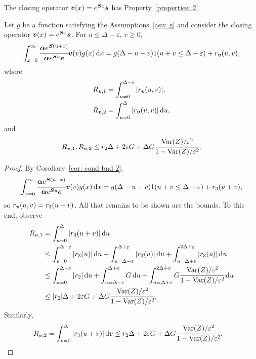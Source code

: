 \begin{cor}\label{cor: cond bnd 2 V}
	The closing operator \(\boldsymbol v(x)=e^{\boldsymbol S x}\boldsymbol s\) has Property~\ref{properties: 2}.

	Let \(g\) be a function satisfying the Assumptions~\ref{asu: g} and consider the closing operator \({\boldsymbol v}(x)=e^{\boldsymbol Sx}\boldsymbol s\). For \(u\leq \Delta-\varepsilon \), \(v\geq 0\), 
	\[\int_{x=0}^\infty \cfrac{\boldsymbol \alpha  e^{\boldsymbol{S} (u+x)} }{\boldsymbol \alpha  e^{\boldsymbol{S} u} \boldsymbol e} {\boldsymbol v}(v)g(x)\, \mathrm{d} x = g(\Delta-u-v) 1(u+v\leq\Delta-\varepsilon) + r_{\boldsymbol v} (u,v),\]
	where 
	\begin{align*}
		\displaystyle R_{\boldsymbol v,1} &= \int_{u=0}^{\Delta-\varepsilon}|r_{\boldsymbol v}(u,v)|,
		\\R_{\boldsymbol v,2} &= \int_{u=0}^\Delta |r_{\boldsymbol v}(u,v)| \, \mathrm{d} u,
	\end{align*}
	and 
	\[R_{\boldsymbol v,1},R_{\boldsymbol v,2}\leq r_2\Delta + 2\varepsilon G + \Delta G \cfrac{\mathrm{Var}(Z)/\varepsilon^2}{1-\mathrm{Var}(Z)/\varepsilon^2}.\]
\end{cor}
\begin{proof}
	By Corollary~\ref{cor: cond bnd 2}, 
	\[\int_{x=0}^\infty \cfrac{\boldsymbol \alpha  e^{\boldsymbol{S} (u+x)} }{\boldsymbol \alpha  e^{\boldsymbol{S} u} \boldsymbol e} {\boldsymbol v}(v)g(x)\, \mathrm{d} x = g(\Delta-u-v) 1(u+v\leq\Delta-\varepsilon) + r_3 (u+v),\]
	so \(r_{\boldsymbol v}(u,v)=r_3(u+v)\). All that remains to be shown are the bounds. To this end, observe 
	\begin{align*}
		R_{{\boldsymbol v},1} 
		 &= \displaystyle\int_{u=0}^{\Delta} |r_3(u+v)|\, \mathrm{d} u 
		 \\&\leq \int_{u=0}^{\Delta-\varepsilon} |r_3(u)|\, \mathrm{d} u + \int_{u=\Delta-\varepsilon}^{\Delta + \varepsilon} |r_3(u)|\, \mathrm{d} u+ \int_{u=\Delta+\varepsilon}^{2\Delta+\varepsilon} |r_3(u)|\, \mathrm{d} u
		 \\&\leq \int_{u=0}^{\Delta-\varepsilon} |r_2|\, \mathrm{d} u + \int_{u=\Delta-\varepsilon}^{\Delta + \varepsilon} G\, \mathrm{d} u+ \int_{u=\Delta+\varepsilon}^{2\Delta+\varepsilon} G \cfrac{\mathrm{Var}(Z)/\varepsilon^2}{1-\mathrm{Var}(Z)/\varepsilon^2}\, \mathrm{d} u
		 \\&\leq |r_2|\Delta + 2\varepsilon G + \Delta G \cfrac{\mathrm{Var}(Z)/\varepsilon^2}{1-\mathrm{Var}(Z)/\varepsilon^2}.
	\end{align*}
	Similarly,
	\begin{align*}
		 R_{{\boldsymbol v},2} 
		 &= \displaystyle\int_{v=0}^{\Delta} |r_3(u+v)|\, \mathrm{d} v 
		 \leq r_2\Delta + 2\varepsilon G + \Delta G \cfrac{\mathrm{Var}(Z)/\varepsilon^2}{1-\mathrm{Var}(Z)/\varepsilon^2}.
	\end{align*}
\end{proof}

